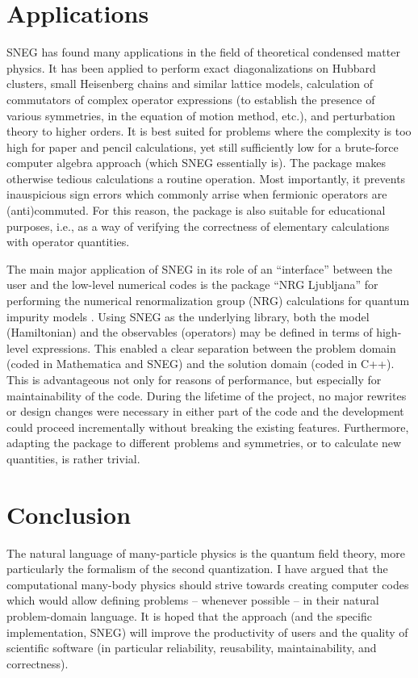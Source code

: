 \documentclass[3p,number,preprint]{elsarticle}
\begin{document}

\section{Applications}
\label{sec5}

SNEG has found many applications in the field of
theoretical condensed matter physics. It has been applied to perform
exact diagonalizations on Hubbard clusters, small Heisenberg chains
and similar lattice models, calculation of commutators of complex
operator expressions (to establish the presence of various symmetries,
in the equation of motion method, etc.), and perturbation theory to
higher orders. It is best suited for problems where the complexity is
too high for paper and pencil calculations, yet still sufficiently low
for a brute-force computer algebra approach (which SNEG essentially
is). The package makes otherwise tedious calculations a routine
operation. Most importantly, it prevents inauspicious sign errors
which commonly arrise when fermionic operators are (anti)commuted. For
this reason, the package is also suitable for educational purposes,
i.e., as a way of verifying the correctness of elementary
calculations with operator quantities.

The main major application of SNEG in its role of an ``interface''
between the user and the low-level numerical codes is the
package ``NRG Ljubljana'' for performing the numerical renormalization
group (NRG) calculations for quantum impurity models
\cite{wilson1975, krishna1980a, bulla2008}. Using SNEG as the
underlying library, both the model (Hamiltonian) and the observables
(operators) may be defined in terms of high-level expressions. This
enabled a clear separation between the problem domain (coded in
Mathematica and SNEG) and the solution domain (coded in C++). This is
advantageous not only for reasons of performance, but especially for
maintainability of the code. During the lifetime of the project, no
major rewrites or design changes were necessary in either part of the
code and the development could proceed incrementally without breaking
the existing features. Furthermore, adapting the package to different
problems and symmetries, or to calculate new quantities, is rather
trivial.


\section{Conclusion}

The natural language of many-particle physics is the quantum field
theory, more particularly the formalism of the second quantization. I
have argued that the computational many-body physics should strive
towards creating computer codes which would allow defining problems --
whenever possible -- in their natural problem-domain language. It is
hoped that the approach (and the specific implementation, SNEG) will
improve the productivity of users and the quality of scientific
software (in particular reliability, reusability, maintainability, and
correctness).


\end{document}
